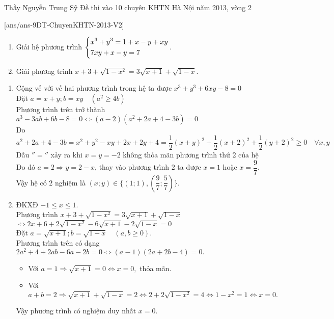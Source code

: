 \begin{name}
{Thầy  Nguyễn Trung Sỹ}
{Đề thi vào 10 chuyên KHTN Hà Nội năm 2013, vòng 2}
\end{name}
\setcounter{ex}{0}
[ans/ans-9DT-ChuyenKHTN-2013-V2]

\begin{ex}%

    \begin{enumerate}    
        
        \item Giải hệ phương trình $\left\{\begin{aligned}& x^3+y^3=1+x-y+xy\\& 7xy+x-y=7\end{aligned}\right.$.
        \item Giải phương trình $x+3+ \sqrt{1-x^2}=3 \sqrt{x+1}+ \sqrt{1-x}$.
    \end{enumerate}
\loigiai
    {
    \begin{enumerate}
        \item Cộng vế với vế hai phương trình trong hệ ta được $x^3+y^3+6xy-8=0$\\
        Đặt $a=x+y; b=xy \quad ( a^2 \geq 4b)$\\
        Phương trình trên trở thành $a^3-3ab+6b-8=0 \Leftrightarrow (a-2)(a^2+2a+4-3b)=0$\\
        Do $a^2+2a+4-3b=x^2+y^2-xy+2x+2y+4= \dfrac{1}{2}(x+y)^2+ \dfrac{1}{2}(x+2)^2 +\dfrac{1}{2}(y+2)^2 \geq 0 \quad \forall x, y$\\
        Dấu $''=''$ xảy ra khi $x=y=-2$ không thỏa mãn phương trình thứ 2 của hệ\\
        Do đó $a=2 \Rightarrow y=2-x$, thay vào phương trình $2$ ta được $x=1$ hoặc $x= \dfrac{9}{7}.$\\
        Vậy hệ có $2$ nghiệm là $(x;y) \in \{ (1;1), \left( \dfrac{9}{7}; \dfrac{5}{7}\right)\}$.
        
       \item ĐKXĐ $-1 \leq x \leq 1.$\\
       Phương trình $x+3+ \sqrt{1-x^2}=3 \sqrt{x+1}+ \sqrt{1-x}$\\
       $ \Leftrightarrow 2x+6+2\sqrt{1-x^2}-6 \sqrt{x+1}-2 \sqrt{1-x}=0$\\
       Đặt $a= \sqrt{x+1}; b=\sqrt{1-x} \quad (a,b \geq 0).$\\
       Phương trình trên có dạng $2a^2+4+2ab-6a-2b=0 \Leftrightarrow (a-1)(2a+2b-4)=0.$
       \begin{itemize}
       	\item Với $a=1 \Rightarrow \sqrt{x+1}=0 \Leftrightarrow x=0,$ thỏa mãn.  
       	\item Với $a+b=2 \Rightarrow \sqrt{x+1}+\sqrt{1-x}=2 \Leftrightarrow 2+2 \sqrt{1-x^2}=4 \Leftrightarrow 1-x^2=1 \Leftrightarrow x=0.$
       \end{itemize}
      Vậy phương trình có nghiệm duy nhất $x=0.$
    \end{enumerate}
    }
\end{ex}


